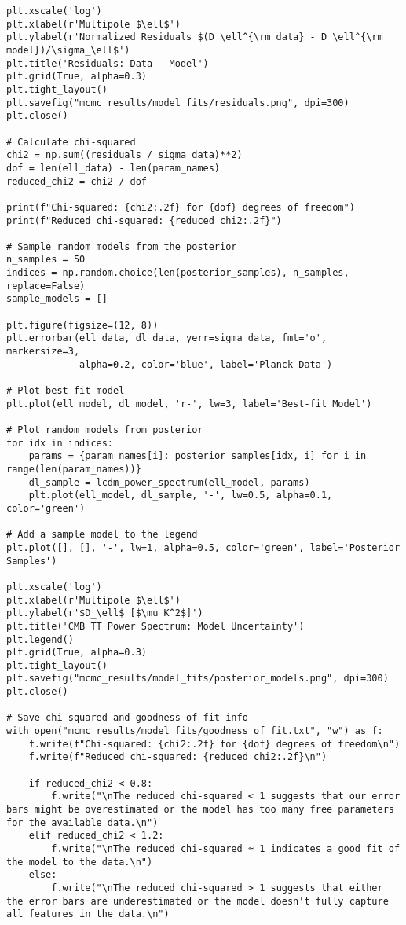 \documentclass[11pt]{article}
\begin{document}
\begin{enumerate}
\begin{lstlisting}[basicstyle=\small\ttfamily]
plt.xscale('log')
plt.xlabel(r'Multipole $\ell$')
plt.ylabel(r'Normalized Residuals $(D_\ell^{\rm data} - D_\ell^{\rm model})/\sigma_\ell$')
plt.title('Residuals: Data - Model')
plt.grid(True, alpha=0.3)
plt.tight_layout()
plt.savefig("mcmc_results/model_fits/residuals.png", dpi=300)
plt.close()

# Calculate chi-squared
chi2 = np.sum((residuals / sigma_data)**2)
dof = len(ell_data) - len(param_names)
reduced_chi2 = chi2 / dof

print(f"Chi-squared: {chi2:.2f} for {dof} degrees of freedom")
print(f"Reduced chi-squared: {reduced_chi2:.2f}")

# Sample random models from the posterior
n_samples = 50
indices = np.random.choice(len(posterior_samples), n_samples, replace=False)
sample_models = []

plt.figure(figsize=(12, 8))
plt.errorbar(ell_data, dl_data, yerr=sigma_data, fmt='o', markersize=3, 
             alpha=0.2, color='blue', label='Planck Data')

# Plot best-fit model
plt.plot(ell_model, dl_model, 'r-', lw=3, label='Best-fit Model')

# Plot random models from posterior
for idx in indices:
    params = {param_names[i]: posterior_samples[idx, i] for i in range(len(param_names))}
    dl_sample = lcdm_power_spectrum(ell_model, params)
    plt.plot(ell_model, dl_sample, '-', lw=0.5, alpha=0.1, color='green')

# Add a sample model to the legend
plt.plot([], [], '-', lw=1, alpha=0.5, color='green', label='Posterior Samples')

plt.xscale('log')
plt.xlabel(r'Multipole $\ell$')
plt.ylabel(r'$D_\ell$ [$\mu K^2$]')
plt.title('CMB TT Power Spectrum: Model Uncertainty')
plt.legend()
plt.grid(True, alpha=0.3)
plt.tight_layout()
plt.savefig("mcmc_results/model_fits/posterior_models.png", dpi=300)
plt.close()

# Save chi-squared and goodness-of-fit info
with open("mcmc_results/model_fits/goodness_of_fit.txt", "w") as f:
    f.write(f"Chi-squared: {chi2:.2f} for {dof} degrees of freedom\n")
    f.write(f"Reduced chi-squared: {reduced_chi2:.2f}\n")
    
    if reduced_chi2 < 0.8:
        f.write("\nThe reduced chi-squared < 1 suggests that our error bars might be overestimated or the model has too many free parameters for the available data.\n")
    elif reduced_chi2 < 1.2:
        f.write("\nThe reduced chi-squared ≈ 1 indicates a good fit of the model to the data.\n")
    else:
        f.write("\nThe reduced chi-squared > 1 suggests that either the error bars are underestimated or the model doesn't fully capture all features in the data.\n")


\end{lstlisting}
\end{enumerate}
\end{document}
